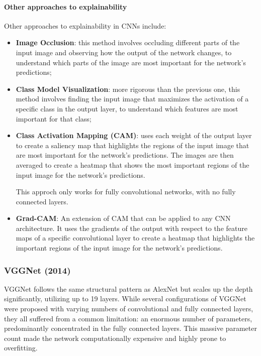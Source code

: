 \paragraph{Other approaches to explainability}
Other approaches to explainability in CNNs include:
\begin{itemize}
    \item \textbf{Image Occlusion}: this method involves occluding different parts of the input image and observing how the output of the network changes, 
    to understand which parts of the image are most important for the network's predictions;
    \item \textbf{Class Model Visualization}: more rigorous than the previous one, this method involves finding the input image that maximizes the activation
    of a specific class in the output layer, to understand which features are most important for that class;
    \item \textbf{Class Activation Mapping (CAM)}: uses each weight of the output layer to create a saliency map that highlights the regions of the input image 
    that are most important for the network's predictions. The images are then averaged to create a heatmap that shows the most important regions of the input image for the network's predictions.
    
    This approch only works for fully convolutional networks, with no fully connected layers.
    \item \textbf{Grad-CAM}: An extension of CAM that can be applied to any CNN architecture. It uses the gradients of the output with respect to the feature maps of a specific convolutional 
    layer to create a heatmap that highlights the important regions of the input image for the network's predictions.
\end{itemize}

\subsubsection{VGGNet (2014)}
VGGNet follows the same structural pattern as AlexNet but scales up the depth significantly, utilizing up to 19 layers. 
While several configurations of VGGNet were proposed with varying numbers of convolutional and fully connected layers, they all suffered from a common limitation: 
an enormous number of parameters, predominantly concentrated in the fully connected layers. 
This massive parameter count made the network computationally expensive and highly prone to overfitting. 


